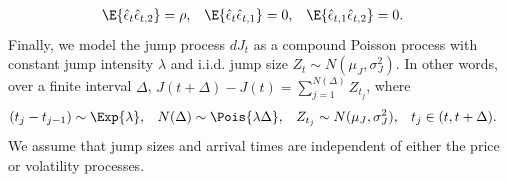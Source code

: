 \begin{align*}
  \E{\hat{\epsilon}_{t}\hat{\epsilon}_{t,2}} &= \rho, & \E{\hat{\epsilon}_{t}\hat{\epsilon}_{t,1}} &= 0, & \E{\hat{\epsilon}_{t,1}\hat{\epsilon}_{t,2}} &= 0.
\end{align*}
Finally, we model the jump process $dJ_t$ as a compound Poisson process with constant jump intensity $\lambda$ and i.i.d. jump size $Z_t \sim N(\mu_J, \sigma^2_J)$. In other words, over a finite interval $\Delta$, $J(t+\Delta) - J(t) = \sum_{j=1}^{N(\Delta)} Z_{t_j}$, where
\begin{align}
  (t_{j} - t_{j-1}) &\sim \Exp{\lambda}, & N(\Delta) &\sim \Pois{\lambda\Delta}, & Z_{t_j} &\sim N(\mu_J, \sigma_J^2), & t_j &\in (t, t+\Delta). \label{eq:jumps-def}
\end{align}
We assume that jump sizes and arrival times are independent of either the price or volatility processes.

